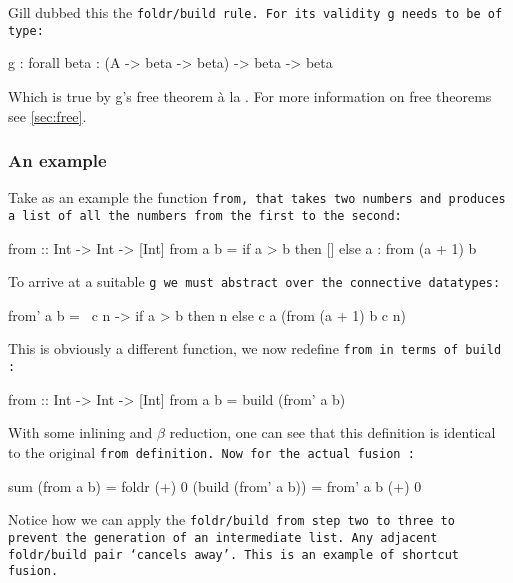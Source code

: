 Gill dubbed this the \tt{foldr/build} rule. For its validity \tt{g} needs to be of type:
\begin{code}
g : forall beta : (A -> beta -> beta) -> beta -> beta
\end{code}
Which is true by g's free theorem \`a la \cite{Wadler1989}. For more information on free theorems see \autoref{sec:free}.

\subsubsection{An example}
Take as an example the function \tt{from}, that takes two numbers and produces a list of all the numbers from the first to the second:
\begin{code}
from :: Int -> Int -> [Int]
from a b = if a > b
           then []
           else a : from (a + 1) b
\end{code}
To arrive at a suitable \tt{g} we must abstract over the connective datatypes:
\begin{code}
from' a b = \ c n  -> if a > b
                      then n
                      else c a (from (a + 1) b c n)
\end{code}
This is obviously a different function, we now redefine \tt{from} in terms of \tt{build} \citep{Gill1993}:
\begin{code}
from :: Int -> Int -> [Int]
from a b = build (from' a b)
\end{code}
With some inlining and $\beta$ reduction, one can see that this definition is identical to the original \tt{from} definition.
Now for the actual fusion \citep{Gill1993}:
\begin{code}
sum (from a b)
  = foldr (+) 0 (build (from' a b))
  = from' a b (+) 0
\end{code}
Notice how we can apply the \tt{foldr/build} from step two to three to prevent the generation of an intermediate list.
Any adjacent \tt{foldr/build} pair `cancels away'.
This is an example of shortcut fusion.

